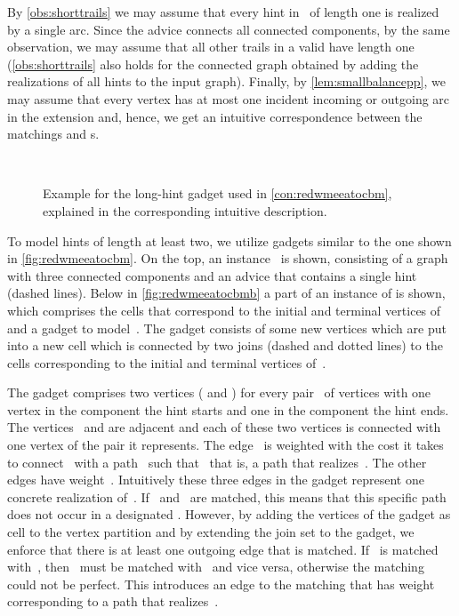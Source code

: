 By \autoref{obs:shorttrails} we may assume that every hint in~ of length one is realized by a single arc. Since the advice connects all connected components, by the same observation, we may assume that all other trails in a valid \EE{} have length one (\autoref{obs:shorttrails} also holds for the connected graph obtained by adding the realizations of all hints to the input graph). Finally, by \autoref{lem:smallbalancepp}, we may assume that every vertex has at most one incident incoming or outgoing arc in the extension and, hence, we get an intuitive correspondence between the matchings and \EE s. 

\begin{figure}
  \begin{center}
     \\
    \caption{Example for the long-hint gadget used in \autoref{con:redwmeeatocbm}, explained in the corresponding intuitive description.}
    \label{fig:redwmeeatocbm}
  \end{center}
\end{figure}
To model hints of length at least two, we utilize gadgets similar to the one shown in \autoref{fig:redwmeeatocbm}. On the top, an instance~ is shown, consisting of a graph with three connected components and an advice that contains a single hint~ (dashed lines). Below in \autoref{fig:redwmeeatocbmb} a part of an instance of \pCBMs{} is shown, which comprises the cells that correspond to the initial and terminal vertices of~ and a gadget to model~. The gadget consists of some new vertices which are put into a new cell which is connected by two joins (dashed and dotted lines) to the cells corresponding to the initial and terminal vertices of~.

The gadget comprises two vertices ( and ) for every pair~ of vertices with one vertex in the component the hint starts and one in the component the hint ends. The vertices~ and  are adjacent and each of these two vertices is connected with one vertex of the pair it represents. The edge~ is weighted with the cost it takes to connect~ with a path~ such that~ that is, a path that realizes~. The other edges have weight~. Intuitively these three edges in the gadget represent one concrete realization of~. If~ and~ are matched, this means that this specific path does not occur in a designated \EE{}. However, by adding the vertices of the gadget as cell to the vertex partition and by extending the join set to the gadget, we enforce that there is at least one outgoing edge that is matched. If~ is matched with~, then~ must be matched with~ and vice versa, otherwise the matching could not be perfect. This introduces an edge to the matching that has weight corresponding to a path that realizes~.

